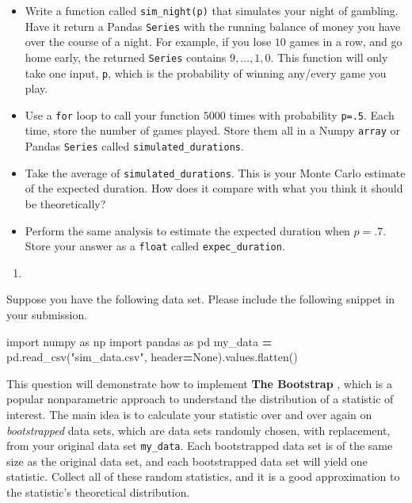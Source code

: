 \documentclass[12pt,krantz2]{krantz}
\makeatletter
\newenvironment{Shaded}{\begin{snugshade}}{\end{snugshade}}
\newcommand{\ImportTok}[1]{#1}
\newcommand{\NormalTok}[1]{#1}
\newcommand{\OperatorTok}[1]{\textcolor[rgb]{0.43,0.43,0.43}{\textbf{#1}}}
\newcommand{\StringTok}[1]{\textcolor[rgb]{0.5,0.5,0.5}{#1}}
\newcommand{\VariableTok}[1]{\textcolor[rgb]{0,0,0}{#1}}
\providecommand{\tightlist}{%
  \setlength{\itemsep}{0pt}\setlength{\parskip}{0pt}}
\newenvironment{kframe}{%
\medskip{}
\setlength{\fboxsep}{.8em}
 \def\at@end@of@kframe{}%
 \ifinner\ifhmode%
  \def\at@end@of@kframe{\end{minipage}}%
  \begin{minipage}{\columnwidth}%
 \fi\fi%
 \def\FrameCommand##1{\hskip\@totalleftmargin \hskip-\fboxsep
 \colorbox{shadecolor}{##1}\hskip-\fboxsep
     \hskip-\linewidth \hskip-\@totalleftmargin \hskip\columnwidth}%
 \MakeFramed {\advance\hsize-\width
   \@totalleftmargin\z@ \linewidth\hsize
   \@setminipage}}%
 {\par\unskip\endMakeFramed%
 \at@end@of@kframe}
\renewenvironment{Shaded}{\begin{kframe}}{\end{kframe}}
\makeatother
\begin{document}
\begin{itemize}
\tightlist
\item
  Write a function called \texttt{sim\_night(p)} that simulates your night of gambling. Have it return a Pandas \texttt{Series} with the running balance of money you have over the course of a night. For example, if you lose \(10\) games in a row, and go home early, the returned \texttt{Series} contains \(9, \ldots, 1,0\). This function will only take one input, \texttt{p}, which is the probability of winning any/every game you play.
\item
  Use a \texttt{for} loop to call your function \(5000\) times with probability \texttt{p=.5}. Each time, store the number of games played. Store them all in a Numpy \texttt{array} or Pandas \texttt{Series} called \texttt{simulated\_durations}.
\item
  Take the average of \texttt{simulated\_durations}. This is your Monte Carlo estimate of the expected duration. How does it compare with what you think it should be theoretically?
\item
  Perform the same analysis to estimate the expected duration when \(p=.7\). Store your answer as a \texttt{float} called \texttt{expec\_duration}.
\end{itemize}

\begin{enumerate}
\def\labelenumi{\arabic{enumi}.}
\setcounter{enumi}{1}
\item
\end{enumerate}

Suppose you have the following data set. Please include the following snippet in your submission.

\begin{Shaded}
\begin{Highlighting}[]
\ImportTok{import}\NormalTok{ numpy }\ImportTok{as}\NormalTok{ np}
\ImportTok{import}\NormalTok{ pandas }\ImportTok{as}\NormalTok{ pd}
\NormalTok{my_data }\OperatorTok{=}\NormalTok{ pd.read_csv(}\StringTok{"sim_data.csv"}\NormalTok{, header}\OperatorTok{=}\VariableTok{None}\NormalTok{).values.flatten()}
\end{Highlighting}
\end{Shaded}

This question will demonstrate how to implement \textbf{The Bootstrap} \citep{bootstrap}, which is a popular nonparametric approach to understand the distribution of a statistic of interest. The main idea is to calculate your statistic over and over again on \emph{bootstrapped} data sets, which are data sets randomly chosen, with replacement, from your original data set \texttt{my\_data}. Each bootstrapped data set is of the same size as the original data set, and each bootstrapped data set will yield one statistic. Collect all of these random statistics, and it is a good approximation to the statistic's theoretical distribution.
\end{document}
